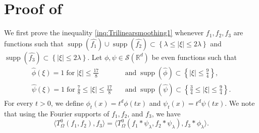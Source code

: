 \documentclass[a4paper,reqno]{amsart}
\newcommand{\R}{{\mathbb R}}       %
\newcommand{\supp}[1]{\operatorname{supp}(#1)}   %
\theoremstyle{definition}
\numberwithin{equation}{section}
\begin{document}
\section{Proof of }\label{sec:proofsmoothing}
We first prove the inequality \eqref{inq:Trilinearsmoothing1} whenever $f_1,f_2,f_3$ are functions such that $\supp{\widehat{f_{1}}}\cup\supp{\widehat{f_{2}}}\subset\left\{\lambda\leq|\xi|\leq2\lambda\right\}$ and $\supp{\widehat{f_{3}}}\subset\left\{|\xi|\leq2\lambda\right\}$. Let $\phi,\psi\in \mathcal{S}(\R^d)$ be even functions such that 
\begin{align*}
	\widehat\phi(\xi)=1\;\text{for}\;|\xi|\leq\frac{17}{8}&\quad\text{and}\;\supp{\widehat\phi}\subset \left\{|\xi|\leq\frac{9}{4}\right\},\\
	\widehat\psi(\xi)=1\;\text{for}\;\frac{7}{8}\leq|\xi|\leq\frac{17}{8}&\quad\text{and}\;\supp{\widehat\psi}\subset \left\{\frac{3}{4}\leq|\xi|\leq\frac{9}{4}\right\}.
\end{align*} 
For every $t>0$, we define $\phi_t(x)=t^d\phi(tx)$ and $\psi_t(x)=t^d\psi(tx)$. We note that using the Fourier supports of $f_1,f_2$, and $f_3$, we have
\[\langle T^0_\Omega(f_1,f_2),f_3\rangle=\langle T^0_\Omega(f_1*\psi_\lambda,f_2*\psi_\lambda),f_3*\phi_{\lambda}\rangle.\]
\end{document}
